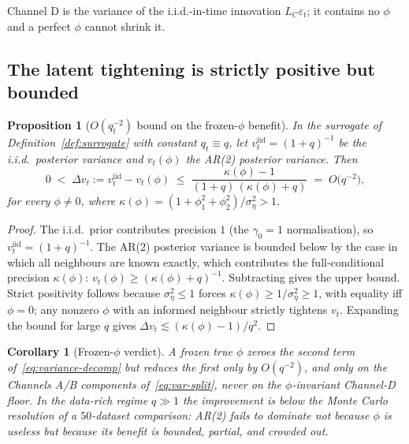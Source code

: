 \documentclass[11pt]{article}
\newtheorem{proposition}{Proposition}
\newtheorem{corollary}{Corollary}
\theoremstyle{definition}
\begin{document}
Channel D is the variance of the i.i.d.-in-time innovation
$L_C \varepsilon_t$; it contains no $\phi$ and a perfect $\phi$ cannot
shrink it.

\subsection{The latent tightening is strictly positive but bounded}

\begin{proposition}[$O(q_t^{-2})$ bound on the frozen-$\phi$ benefit]
\label{prop:frozen-bound}
In the surrogate of Definition~\ref{def:surrogate} with constant
$q_t \equiv q$, let $v_t^{\mathrm{iid}} = (1+q)^{-1}$ be the i.i.d.\
posterior variance and $v_t(\phi)$ the AR(2) posterior variance. Then
\begin{equation}
  0 \;<\; \Delta v_t := v_t^{\mathrm{iid}} - v_t(\phi)
    \;\le\; \frac{\kappa(\phi) - 1}{(1 + q)\,(\kappa(\phi) + q)}
    \;=\; O\!\big(q^{-2}\big),
  \label{eq:frozen-bound}
\end{equation}
for every $\phi \ne 0$, where
$\kappa(\phi) = (1 + \phi_1^2 + \phi_2^2)/\sigma_\eta^2 > 1$.
\end{proposition}

\begin{proof}
The i.i.d.\ prior contributes precision $1$ (the $\gamma_0 = 1$
normalisation), so $v_t^{\mathrm{iid}} = (1+q)^{-1}$. The AR(2)
posterior variance is bounded below by the case in which all
neighbours are known exactly, which contributes the full-conditional
precision $\kappa(\phi)$: $v_t(\phi) \ge (\kappa(\phi) + q)^{-1}$.
Subtracting gives the upper bound. Strict positivity follows because
$\sigma_\eta^2 \le 1$ forces $\kappa(\phi) \ge 1/\sigma_\eta^2 \ge 1$,
with equality iff $\phi = 0$; any nonzero $\phi$ with an informed
neighbour strictly tightens $v_t$. Expanding the bound for large $q$
gives $\Delta v_t \lesssim (\kappa(\phi)-1)/q^2$.
\end{proof}

\begin{corollary}[Frozen-$\phi$ verdict]
\label{cor:frozen-verdict}
A frozen true $\phi$ zeroes the second term of~\eqref{eq:variance-decomp}
but reduces the first only by $O(q^{-2})$, and only on the
Channels A/B components of~\eqref{eq:var-split}, never on the
$\phi$-invariant Channel-D floor. In the data-rich regime $q \gg 1$
the improvement is below the Monte Carlo resolution of a $50$-dataset
comparison: AR(2) fails to \emph{dominate} not because $\phi$ is
useless but because its benefit is bounded, partial, and crowded out.
\end{corollary}
\end{document}
